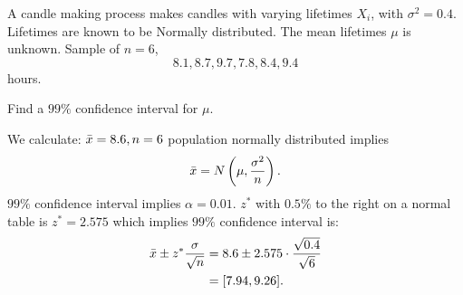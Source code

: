 \documentclass[10pt, a4paper]{article}
\begin{document}
\begin{example}
    A candle making process makes candles with varying lifetimes $X_i$,
    with $\sigma ^ 2 = 0.4$.
    Lifetimes are known to be Normally distributed.
    The mean lifetimes $\mu$ is unknown.
    Sample of $n = 6$,
    \[
    8.1, 8.7, 9.7, 7.8, 8.4, 9.4
    \]
    hours.

    Find a $99\%$ confidence interval for $\mu$.

    \begin{solution}
        We calculate:
        $\Bar{x} = 8.6, n = 6$ population normally distributed implies
        \[
        \Bar{x} = N\left(\mu, \frac{\sigma ^ 2}{n}\right).
        \]
        $99\%$ confidence interval implies $\alpha = 0.01$.
        $z ^ {*}$ with $0.5\%$ to the right on a normal table is $z ^ {*} = 2.575$ which implies $99\%$ confidence interval is:
        \begin{align*}
            \Bar{x} \pm z ^ {*}\frac{\sigma}{\sqrt{n}} &= 8.6 \pm 2.575 \cdot \frac{\sqrt{0.4}}{\sqrt{6}} \\
            &= [7.94, 9.26].
        \end{align*}
    \end{solution}
\end{example}
\end{document}
